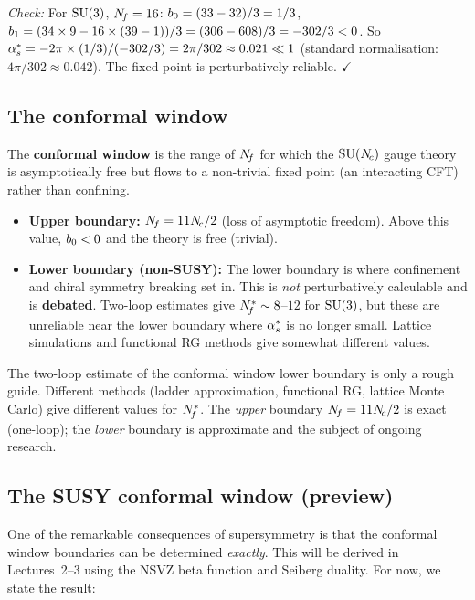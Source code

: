 \documentclass[11pt,a4paper]{article}
\begin{document}
\textit{Check:} For $\mathrm{SU}(3)$, $N_{\!f} = 16$:
$b_0 = (33 - 32)/3 = 1/3$,
$b_1 = (34 \times 9 - 16 \times (39 - 1))/3 = (306 - 608)/3 = -302/3 < 0$.
So $\alpha_s^* = -2\pi \times (1/3)/(-302/3) = 2\pi/302 \approx 0.021 \ll 1$
(standard normalisation: $4\pi/302 \approx 0.042$).
The fixed point is perturbatively reliable.  $\checkmark$

\subsection{The conformal window}

The \textbf{conformal window} is the range of $N_{\!f}$ for which the
$\mathrm{SU}(N_{\!c})$ gauge theory is asymptotically free but flows to a non-trivial
\IR{} fixed point (an interacting CFT) rather than confining.

\begin{itemize}
  \item \textbf{Upper boundary:} $N_{\!f} = 11N_{\!c}/2$ (loss of asymptotic freedom).
    Above this value, $b_0 < 0$ and the theory is \IR{} free (trivial).
  \item \textbf{Lower boundary (non-SUSY):} The lower boundary is where
    confinement and chiral symmetry breaking set in.  This is
    \emph{not} perturbatively calculable and is \textbf{debated}.
    Two-loop estimates give $N_{\!f}^* \sim 8$--$12$ for $\mathrm{SU}(3)$, but these
    are unreliable near the lower boundary where $\alpha_s^*$ is no longer
    small.  Lattice simulations \cite{DeGrand2015,Hasenbusch2021} and
    functional RG methods give somewhat different values.
\end{itemize}

\begin{warningbox}[title={The non-SUSY lower boundary is model-dependent}]
  The two-loop estimate of the conformal window lower boundary is only
  a rough guide.  Different methods (ladder approximation, functional RG,
  lattice Monte Carlo) give different values for $N_{\!f}^*$.
  The \emph{upper} boundary $N_{\!f} = 11N_{\!c}/2$ is exact (one-loop); the
  \emph{lower} boundary is approximate and the subject of ongoing
  research.
\end{warningbox}

\subsection{The SUSY conformal window (preview)}

One of the remarkable consequences of supersymmetry is that the conformal
window boundaries can be determined \emph{exactly}.  This will be derived
in Lectures~2--3 using the NSVZ beta function and Seiberg duality.
For now, we state the result:
\end{document}

